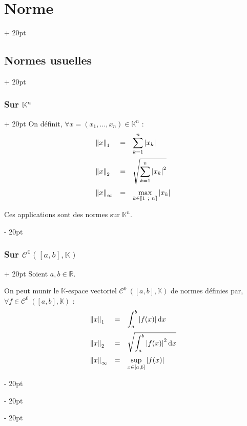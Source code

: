 \documentclass[a4paper, 12pt, twoside]{article}
\newcommand{\R}{\mathbb{R}} %
\newcommand{\K}{\mathbb K}
\newcommand{\nset}[2]{\left\llbracket #1\ ;\ #2 \right\rrbracket}
\newcommand{\dint}[4][x]{\displaystyle \int_{#2}^{#3} #4 \mathrm{d} #1} %
\newcommand{\lr}[1]{\left( #1 \right)}
\newcommand{\abs}[1]{\left\lvert #1 \right\rvert}
\newcommand{\norm}[1]{\left\lVert #1 \right\rVert}
\newcommand{\ind}[1][20pt]{\advance\leftskip + #1}
\newcommand{\deind}[1][20pt]{\advance\leftskip - #1}
\newenvironment{indt}[2][20pt]{#2 \par \ind[#1]}{\par \deind} %
\begin{document}
\begin{indt}{\section{Norme}}
\begin{indt}{\subsection{Normes usuelles}}
\begin{indt}{\subsubsection{Sur $\K^n$}}
                On définit, $\forall x = (x_1, \ldots, x_n) \in \K^n$ :
                \[
                    \begin{array}{lcl}
                        \norm{x}_1
                        &=& \displaystyle
                        \sum_{k = 1}^n \abs{x_k}
                        \vspace{6pt}
                        \\
                        \norm{x}_2
                        &=& \displaystyle
                        \sqrt{\sum_{k = 1}^n \abs{x_k}^2}
                        \vspace{6pt}
                        \\
                        \norm{x}_\infty
                        &=& \displaystyle
                        \max_{k \in \nset 1 n} \abs{x_k}
                    \end{array}
                \]

                Ces applications sont des normes sur $\K^n$.
            \end{indt}

            \vspace{12pt}
            
            \begin{indt}{\subsubsection{Sur $\mathcal C^0\!\lr{[a, b], \K}$}}
                Soient $a, b \in \R$.

                On peut munir le $\K$-espace vectoriel $\mathcal C^0\:\lr{[a, b], \K}$ de normes définies par, \newline $\forall f \in \mathcal C^0\:\lr{[a, b], \K}$ :
                \[
                    \begin{array}{lcl}
                        \norm{x}_1
                        &=& \displaystyle
                        \dint a b {\abs{f(x)}}
                        \vspace{6pt}
                        \\
                        \norm{x}_2
                        &=& \displaystyle
                        \sqrt{\dint a b {\abs{f(x)}^2}}
                        \vspace{6pt}
                        \\
                        \norm{x}_\infty
                        &=& \displaystyle
                        \sup_{x \in [a, b]} \abs{f(x)}
                    \end{array}
                \]
            \end{indt}
        \end{indt}


\end{indt}
\end{document}
